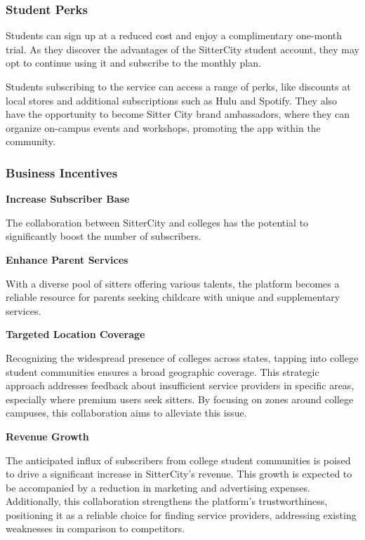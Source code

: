 \documentclass[12pt]{article}
\begin{document}
\hypertarget{student-perks}{%
\subsubsection{\texorpdfstring{\textbf{Student
Perks}}{Student Perks}}\label{student-perks}}

Students can sign up at a reduced cost and enjoy a complimentary
one-month trial. As they discover the advantages of the SitterCity
student account, they may opt to continue using it and subscribe to the
monthly plan.~

Students subscribing to the service can access a range of perks, like
discounts at local stores and additional subscriptions such as Hulu and
Spotify. They also have the opportunity to become Sitter City brand
ambassadors, where they can organize on-campus events and workshops,
promoting the app within the community.~

\hypertarget{business-incentives}{%
\subsubsection{\texorpdfstring{\textbf{Business
Incentives}}{Business Incentives}}\label{business-incentives}}

\textbf{Increase Subscriber Base}

The collaboration between SitterCity and colleges has the potential to
significantly boost the number of subscribers.~

\textbf{Enhance Parent Services}

With a diverse pool of sitters offering various talents, the platform
becomes a reliable resource for parents seeking childcare with unique
and supplementary services.

\textbf{Targeted Location Coverage}

Recognizing the widespread presence of colleges across states, tapping
into college student communities ensures a broad geographic coverage.
This strategic approach addresses feedback about insufficient service
providers in specific areas, especially where premium users seek
sitters. By focusing on zones around college campuses, this
collaboration aims to alleviate this issue.

\textbf{Revenue Growth}

The anticipated influx of subscribers from college student communities
is poised to drive a significant increase in SitterCity's revenue. This
growth is expected to be accompanied by a reduction in marketing and
advertising expenses. Additionally, this collaboration strengthens the
platform's trustworthiness, positioning it as a reliable choice for
finding service providers, addressing existing weaknesses in comparison
to competitors.
\end{document}
